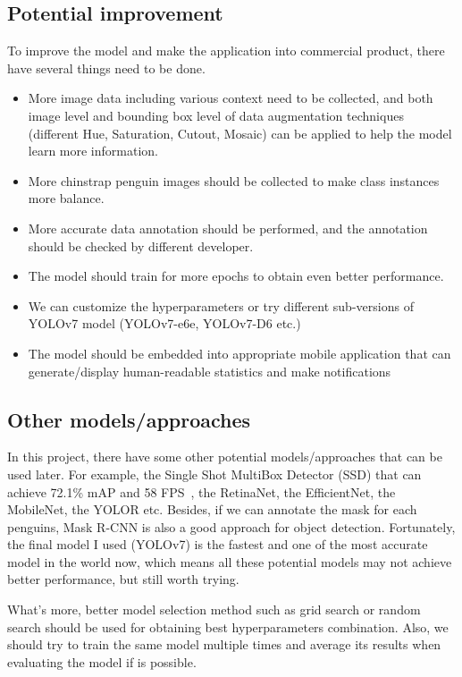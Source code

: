\documentclass[runningheads]{llncs}
\begin{document}
\subsection{Potential improvement}
To improve the model and make the application into commercial product, there have several things need to be done. 
\begin{itemize}
    \item More image data including various context need to be collected, and both image level and bounding box level of data augmentation techniques (different Hue, Saturation, Cutout, Mosaic) can be applied to help the model learn more information.
    \item More chinstrap penguin images should be collected to make class instances more balance.
    \item More accurate data annotation should be performed, and the annotation should be checked by different developer.
    \item The model should train for more epochs to obtain even better performance.
    \item We can customize the hyperparameters or try different sub-versions of YOLOv7 model (YOLOv7-e6e, YOLOv7-D6 etc.)
    \item The model should be embedded into appropriate mobile application that can generate/display human-readable statistics and make notifications
\end{itemize}


\subsection{Other models/approaches}
In this project, there have some other potential models/approaches that can be used later. For example, the Single Shot MultiBox Detector (SSD) that can achieve 72.1\% mAP and 58 FPS~\cite{ssd}, the RetinaNet, the EfficientNet, the MobileNet, the YOLOR etc. Besides, if we can annotate the mask for each penguins, Mask R-CNN is also a good approach for object detection. Fortunately, the final model I used (YOLOv7) is the fastest and one of the most accurate model in the world now, which means all these potential models may not achieve better performance, but still worth trying. 

What's more, better model selection method such as grid search or random search should be used for obtaining best hyperparameters combination. Also, we should try to train the same model multiple times and average its results when evaluating the model if is possible. 
\end{document}

